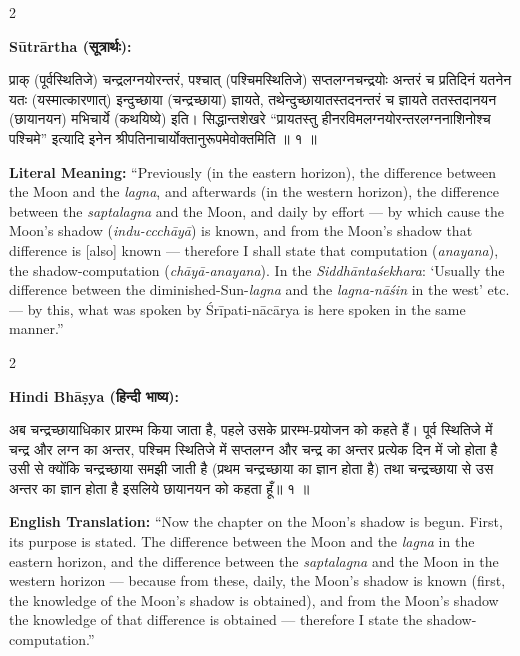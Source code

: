 \documentclass[11pt,a4paper]{article}
\newcommand{\dev}[1]{{\devanagarifont #1}}
\newenvironment{sanskritverse}{%
  \begin{center}\begin{minipage}{0.95\textwidth}
  \setlength{\leftskip}{1em}
  \setlength{\rightskip}{1em}
  \dev
}{\end{minipage}\end{center}}
\begin{document}
\begin{paracol}{2}

\noindent\textbf{Sūtrārtha (\dev{सूत्रार्थः}):}
\begin{sanskritverse}
प्राक् (पूर्वस्थितिजे) चन्द्रलग्नयोरन्तरं, पश्चात् (पश्चिमस्थितिजे) सप्तलग्नचन्द्रयोः
अन्तरं च प्रतिदिनं यतनेन यतः (यस्मात्कारणात्) इन्दुच्छाया (चन्द्रच्छाया) ज्ञायते,
तथेन्दुच्छायातस्तदनन्तरं च ज्ञायते ततस्तदानयन (छायानयन) मभिचार्ये (कथयिष्ये) इति।
सिद्धान्तशेखरे ``प्रायतस्तु हीनरविमलग्नयोरन्तरलग्ननाशिनोश्च पश्चिमे'' इत्यादि
इनेन श्रीपतिनाचार्योक्तानुरूपमेवोक्तमिति ॥ १ ॥
\end{sanskritverse}

\switchcolumn

\textbf{Literal Meaning:} ``Previously (in the eastern horizon), the difference between the Moon and the \textit{lagna}, and afterwards (in the western horizon), the difference between the \textit{saptalagna} and the Moon, and daily by effort --- by which cause the Moon's shadow (\textit{indu-ccchāyā}) is known, and from the Moon's shadow that difference is [also] known --- therefore I shall state that computation (\textit{anayana}), the shadow-computation (\textit{chāyā-anayana}). In the \textit{Siddhāntaśekhara}: `Usually the difference between the diminished-Sun-\textit{lagna} and the \textit{lagna-nāśin} in the west' etc. --- by this, what was spoken by Śrīpati-nācārya is here spoken in the same manner.''

\end{paracol}

\vspace{0.5em}

\begin{paracol}{2}

\noindent\textbf{Hindi Bhāṣya (\dev{हिन्दी भाष्य}):}
\begin{sanskritverse}
अब चन्द्रच्छायाधिकार प्रारम्भ किया जाता है, पहले उसके प्रारम्भ-प्रयोजन को कहते हैं।
पूर्व स्थितिजे में चन्द्र और लग्न का अन्तर, पश्चिम स्थितिजे में सप्तलग्न और चन्द्र का अन्तर
प्रत्येक दिन में जो होता है उसी से क्योंकि चन्द्रच्छाया समझी जाती है (प्रथम चन्द्रच्छाया
का ज्ञान होता है) तथा चन्द्रच्छाया से उस अन्तर का ज्ञान होता है इसलिये छायानयन को
कहता हूँ॥ १ ॥
\end{sanskritverse}

\switchcolumn

\textbf{English Translation:} ``Now the chapter on the Moon's shadow is begun. First, its purpose is stated. The difference between the Moon and the \textit{lagna} in the eastern horizon, and the difference between the \textit{saptalagna} and the Moon in the western horizon --- because from these, daily, the Moon's shadow is known (first, the knowledge of the Moon's shadow is obtained), and from the Moon's shadow the knowledge of that difference is obtained --- therefore I state the shadow-computation.''

\end{paracol}
\end{document}
